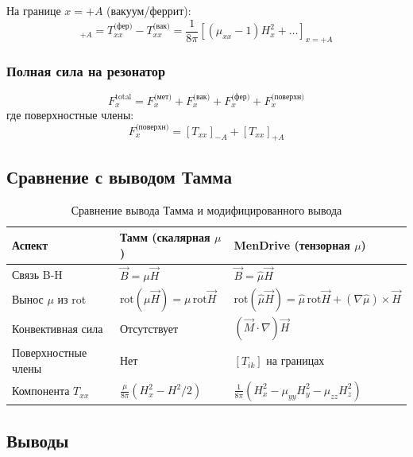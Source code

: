\documentclass[a4paper,12pt]{article}
\begin{document}
На границе $x = +A$ (вакуум/феррит):
\begin{equation}
[T_{xx}]_{+A} = T_{xx}^{\text{(фер)}} - T_{xx}^{\text{(вак)}} = \frac{1}{8\pi}\left[(\mu_{xx}-1)H_x^2 + \ldots\right]_{x=+A}
\label{eq:jump_right}
\end{equation}

\subsubsection{Полная сила на резонатор}

\begin{equation}
\boxed{
F_x^{\text{total}} = F_x^{\text{(мет)}} + F_x^{\text{(вак)}} + F_x^{\text{(фер)}} + F_x^{\text{(поверхн)}}
}
\label{eq:total_force}
\end{equation}
где поверхностные члены:
\begin{equation}
F_x^{\text{(поверхн)}} = [T_{xx}]_{-A} + [T_{xx}]_{+A}
\label{eq:surface_terms}
\end{equation}

\subsection{Сравнение с выводом Тамма}

\begin{table}[h]
\centering
\caption{Сравнение вывода Тамма и модифицированного вывода}
\label{tab:tamm_comparison}
\begin{tabular}{@{}lll@{}}
\toprule
\textbf{Аспект} & \textbf{Тамм (скалярная $\mu$)} & \textbf{MenDrive (тензорная $\mu$)} \\
\midrule
Связь B-H & $\vec{B} = \mu\vec{H}$ & $\vec{B} = \hat{\mu}\vec{H}$ \\
Вынос $\mu$ из rot & $\text{rot}(\mu\vec{H}) = \mu\,\text{rot}\vec{H}$ & $\text{rot}(\hat{\mu}\vec{H}) = \hat{\mu}\,\text{rot}\vec{H} + (\nabla\hat{\mu})\times\vec{H}$ \\
Конвективная сила & Отсутствует & $(\vec{M}\cdot\nabla)\vec{H}$ \\
Поверхностные члены & Нет & $[T_{ik}]$ на границах \\
Компонента $T_{xx}$ & $\frac{\mu}{8\pi}(H_x^2 - H^2/2)$ & $\frac{1}{8\pi}(H_x^2 - \mu_{yy}H_y^2 - \mu_{zz}H_z^2)$ \\
\bottomrule
\end{tabular}
\end{table}

\subsection{Выводы}
\end{document}
